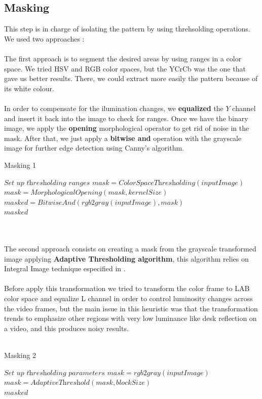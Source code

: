 \documentclass[journal]{IEEEtran}
\begin{document}
\subsection{Masking}
This step is in charge of isolating the pattern by using threhsolding operations. We used two approaches :
\\
\\
The first approach is to segment the desired areas by using ranges in a color space. We tried HSV and RGB color spaces, but the YCrCb was the one that gave us better results. There, we could extract more easily the pattern because of its white colour.
\\
\\
In order to compensate for the ilumination changes, we \textbf{equalized} the $Y$ channel and insert it back into the image to check for ranges. Once we have the binary image, we apply the \textbf{opening} morphological operator to get rid of noise in the mask. After that, we just apply a \textbf{bitwise and} operation with the grayscale image for further edge detection using Canny's algorithm.
\begin{algorithm}
\caption{Masking 1}
\begin{algorithmic}[1]
\State $\textit{Set up thresholding ranges}$
\State $mask   = \textit{ColorSpaceThresholding}(inputImage)$
\State $mask   = \textit{MorphologicalOpening}(mask, kernelSize)$
\State $masked = \textit{BitwiseAnd}( \textit{rgb2gray}( inputImage ), mask )$\\
\Return $masked$
\end{algorithmic}
\end{algorithm}
\\
\\
The second approach consists on creating a mask from the grayscale transformed image applying \textbf{Adaptive Thresholding algorithm}, this algorithm relies on Integral Image technique especified in \cite{IntegralImageThresholding}.
\\
\\
Before apply this transformation we tried to transform the color frame to LAB color space and equalize L channel in order to control luminosity changes across the video frames, but the main issue in this heuristic was that the transformation trends to emphasize other regions with very low luminance like desk reflection on a video, and this produces noisy results.
\\
\\
\begin{algorithm}
\caption{Masking 2}
\label{alg:mask2}
\begin{algorithmic}[1]
\State $\textit{Set up thresholding parameters}$
\State $mask   = \textit{rgb2gray}( inputImage )$
\State $mask   = \textit{AdaptiveThreshold}(mask, blockSize)$\\
\Return $masked$
\end{algorithmic}
\end{algorithm}
\end{document}
